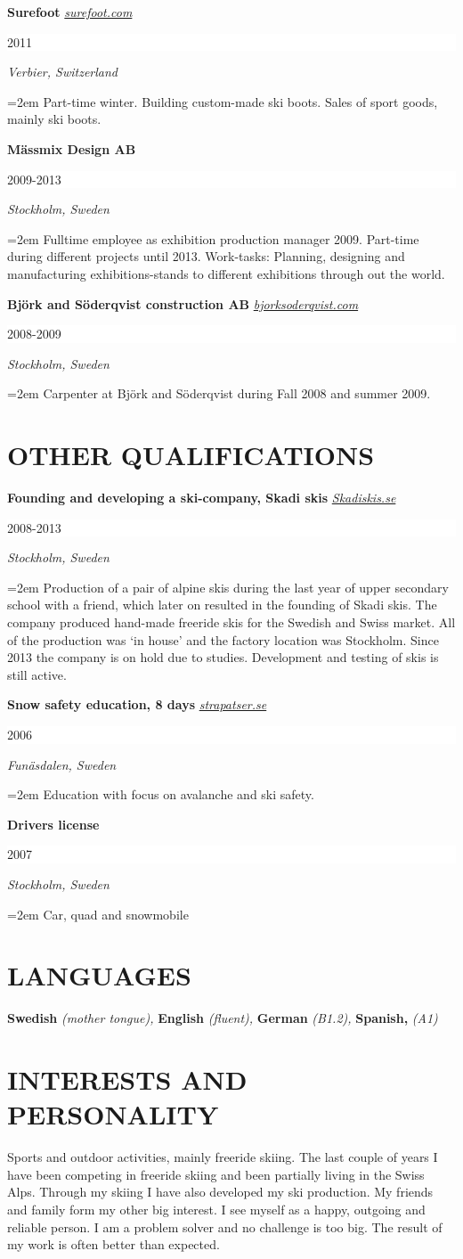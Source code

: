 \documentclass[paper=letter,fontsize=11pt]{scrartcl} %
\newcommand{\sepspace}{\vspace*{1em}}		%
\newcommand{\NewPart}[2]{\section*{\uppercase{#1} \small \normalfont #2}}
\newcommand{\WorkEntry}[5]{
		\noindent \textbf{#1}
        \noindent \small \textit{#2}
        \hfill      %
        \colorbox{White}{%
			\parbox{6em}{%
			\hfill\color{Black}#3}} \par  %
		\noindent \textit{#4} \par        %
		\noindent\hangindent=2em\hangafter=0 \small #5 %
		\normalsize \par}
\newcommand{\Language}[2]{
		\noindent \textbf{#1}
        \noindent \small \textit{#2}}
\newcommand{\Text}[1]{\par       
		\noindent \small #1 
		\normalsize \par}
\begin{document}
\sepspace

\WorkEntry{Surefoot}{\href{http://www.surefoot.com}{surefoot.com}}{2011}{Verbier, Switzerland}{Part-time winter. Building custom-made ski boots. Sales of sport goods, mainly ski boots.}
\sepspace

\WorkEntry{Mässmix Design AB }{}{2009-2013}{Stockholm, Sweden}{Fulltime employee as exhibition production manager 2009. Part-time during different projects until 2013. Work-tasks: Planning, designing and manufacturing exhibitions-stands to different exhibitions through out the world.}
\sepspace

\WorkEntry{Björk and Söderqvist construction AB}{\href{http://bjorksoderqvist.com}{bjorksoderqvist.com}}{2008-2009}{Stockholm, Sweden}{Carpenter at Björk and Söderqvist during Fall 2008 and summer 2009.}

\sepspace



\NewPart{OTHER QUALIFICATIONS}{}

\WorkEntry{Founding and developing a ski-company, Skadi skis}{\href{https://www.facebook.com/skadiskis/}{Skadiskis.se}}{2008-2013}{Stockholm, Sweden}{Production of a pair of alpine skis during the last year of upper secondary school with a friend, which later on resulted in the founding of Skadi skis.
The company produced hand-made freeride skis for the Swedish and Swiss market. All of the production was ‘in house’ and the factory location was Stockholm. Since 2013 the company is on hold due to studies. Development and testing of skis is still active.}
\sepspace

\WorkEntry{Snow safety education, 8 days}{\href{http://www.strapatser.se}{strapatser.se}}{2006}{Funäsdalen, Sweden}{Education with focus on avalanche and ski safety.}
\sepspace
\WorkEntry{Drivers license}{}{2007}{Stockholm, Sweden}{Car, quad and snowmobile}


\NewPart{LANGUAGES}{}

\Language{Swedish}{(mother tongue),}\Language{English}{(fluent),}\Language{German}{(B1.2),}\Language{Spanish,}{(A1)}


\NewPart{Interests and personality}{}

\Text{Sports and outdoor activities, mainly freeride skiing. The last couple of years I have been competing in freeride skiing and been partially living in the Swiss Alps. Through my skiing I have also developed my ski production. My friends and family form my other big interest. I see myself as a happy, outgoing and reliable person. I am a problem solver and no challenge is too big. The result of my work is often better than expected.}
\end{document}
